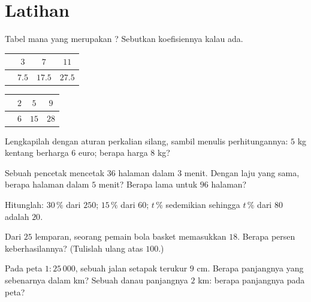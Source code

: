 \section{Latihan}

\begin{exercise}[$\star$]\label{exo:g7:prop:1}
Tabel mana yang merupakan ? Sebutkan
koefisiennya kalau ada.
\begin{center}
\renewcommand{\arraystretch}{1.2}
\begin{tabular}{l|ccc}
 & $3$ & $7$ & $11$ \\
\hline
 & $7.5$ & $17.5$ & $27.5$ \\
\end{tabular}
\qquad
\begin{tabular}{l|ccc}
 & $2$ & $5$ & $9$ \\
\hline
 & $6$ & $15$ & $28$ \\
\end{tabular}
\end{center}
\end{exercise}

\begin{exercise}[$\star$]\label{exo:g7:prop:2}
Lengkapilah dengan aturan perkalian silang, sambil menulis
perhitungannya: $5$ kg kentang berharga $6$ euro; berapa harga $8$ kg?
\end{exercise}

\begin{exercise}[$\star$]\label{exo:g7:prop:3}
Sebuah pencetak mencetak $36$ halaman dalam $3$ menit. Dengan laju
yang sama, berapa halaman dalam $5$ menit? Berapa lama untuk $96$ halaman?
\end{exercise}

\begin{exercise}[$\star$]\label{exo:g7:prop:4}
Hitunglah: $30\,\%$ dari $250$; \quad $15\,\%$ dari $60$; \quad
$t\,\%$ sedemikian sehingga $t\,\%$ dari $80$ adalah $20$.
\end{exercise}

\begin{exercise}[$\star$]\label{exo:g7:prop:5}
Dari $25$ lemparan, seorang pemain bola basket memasukkan $18$. Berapa
persen keberhasilannya? (Tulislah ulang  atas $100$.)
\end{exercise}

\begin{exercise}[$\star$]\label{exo:g7:prop:6}
Pada peta $1 : 25\,000$, sebuah jalan setapak terukur $9$ cm. Berapa
panjangnya yang sebenarnya dalam km? Sebuah danau panjangnya $2$ km: berapa panjangnya pada peta?
\end{exercise}

